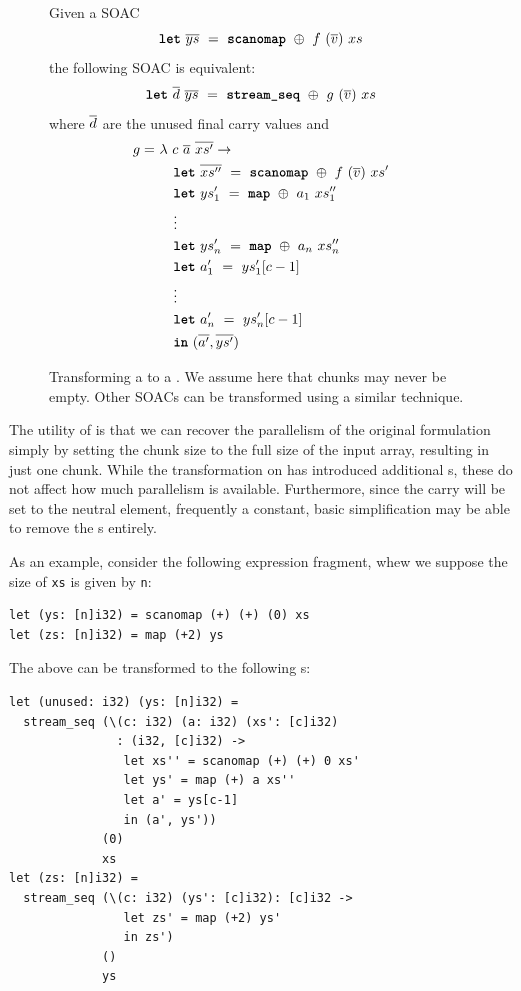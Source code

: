 \begin{figure}[bt]
Given a SOAC
\[
  \mbox{\texttt{\bfseries{let}}}~\overline{ys}~=~\mbox{\texttt{\bfseries{scanomap}}}~\oplus~f~(\overline{v})~xs
\]
the following SOAC is equivalent:
\[
  \mbox{\texttt{\bfseries{let}}}~\overline{d}~\overline{ys}~=~\mbox{\texttt{\bfseries{stream\_seq}}}{}~\oplus~g~(\overline{v})~xs
\]
where $\overline{d}$ are the unused final carry values and
  \begin{align*}
    g =~& \lambda~c~\overline{a}~\overline{xs'} \rightarrow \\
        & \quad \mbox{\texttt{\bfseries{let}}}~\overline{xs''}~=~\mbox{\texttt{\bfseries{scanomap}}}~\oplus~f~(\overline{v})~xs' \\
        & \quad \mbox{\texttt{\bfseries{let}}}~ys'_{1}~=~\mbox{\texttt{\bfseries{map}}}~\oplus~a_{1}~xs''_{1} \\
        & \quad \vdots \\
        & \quad \mbox{\texttt{\bfseries{let}}}~ys'_{n}~=~\mbox{\texttt{\bfseries{map}}}~\oplus~a_{n}~xs''_{n} \\
        & \quad \mbox{\texttt{\bfseries{let}}}~a'_{1}~=~ys'_{1}[c-1] \\
        & \quad \vdots \\
        & \quad \mbox{\texttt{\bfseries{let}}}~a'_{n}~=~ys'_{n}[c-1] \\
        & \quad \mbox{\texttt{\bfseries{in}}}~(\overline{a'},\overline{ys'}) \\
  \end{align*}
  \caption{Transforming a  to a \StreamSeq{}.  We assume
    here that chunks may never be empty.  Other SOACs can be
    transformed using a similar technique.}
  \label{fig:scanomap-to-streamseq}
\end{figure}

The utility of \StreamSeq{} is that we can recover the parallelism of
the original formulation simply by setting the chunk size to the full
size of the input array, resulting in just one chunk.  While the
transformation on  has introduced
additional s, these do not affect how much parallelism is
available.  Furthermore, since the carry will be set to the neutral
element, frequently a constant, basic simplification may be able to
remove the s entirely.

As an example, consider the following expression fragment, whew we
suppose the size of \lstinline{xs} is given by \lstinline{n}:

\begin{lstlisting}
let (ys: [n]i32) = scanomap (+) (+) (0) xs
let (zs: [n]i32) = map (+2) ys
\end{lstlisting}

The above can be transformed to the following \StreamSeq{}s:

\begin{lstlisting}
let (unused: i32) (ys: [n]i32) =
  stream_seq (\(c: i32) (a: i32) (xs': [c]i32)
               : (i32, [c]i32) ->
                let xs'' = scanomap (+) (+) 0 xs'
                let ys' = map (+) a xs''
                let a' = ys[c-1]
                in (a', ys'))
             (0)
             xs
let (zs: [n]i32) =
  stream_seq (\(c: i32) (ys': [c]i32): [c]i32 ->
                let zs' = map (+2) ys'
                in zs')
             ()
             ys
\end{lstlisting}

